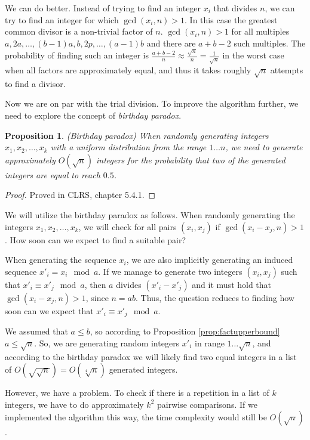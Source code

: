 \documentclass[12pt] {article}
\theoremstyle{plain}
\newtheorem{prop}[thm]{Proposition}
\theoremstyle{definition}
\begin{document}
We can do better. Instead of trying to find an integer $x_i$ that divides $n$, we can try to find an integer for which $\gcd(x_i, n) > 1$. In this case the greatest common divisor is a non-trivial factor of $n$. $\gcd(x_i, n) > 1$ for all multiples $a, 2a, \dots, (b-1)a, b, 2p, \dots, (a-1)b$ and there are $a + b - 2$ such multiples. The probability of finding such an integer is $\frac{a+b-2}{n} \approx \frac{\sqrt{n}}{n} = \frac{1}{\sqrt{n}}$ in the worst case when all factors are approximately equal, and thus it takes roughly $\sqrt{n}$ attempts to find a divisor.

Now we are on par with the trial division. To improve the algorithm further, we need to explore the concept of \textit{birthday paradox}.

\begin{prop} (Birthday paradox)
\label {prop:birthdayparadox}
When randomly generating integers $x_1, x_2, \dots, x_k$ with a uniform distribution from the range $1 \dots n$, we need to generate approximately $O(\sqrt{n})$ integers for the probability that two of the generated integers are equal to reach $0.5$.
\end{prop}

\begin{proof}
Proved in CLRS, chapter 5.4.1\cite{clrs}.
\end{proof}

We will utilize the birthday paradox as follows. When randomly generating the integers $x_1, x_2, \dots, x_k$, we will check for all pairs $(x_i, x_j)$ if $\gcd(x_i - x_j, n) > 1$. How soon can we expect to find a suitable pair?

When generating the sequence $x_i$, we are also implicitly generating an induced sequence $x'_i = x_i \mod a$. If we manage to generate two integers $(x_i, x_j)$ such that $x'_i \equiv x'_j \mod a$, then $a$ divides $(x'_i-x'_j)$ and it must hold that $\gcd(x_i-x_j, n) > 1$, since $n = ab$. Thus, the question reduces to finding how soon can we expect that $x'_i \equiv x'_j \mod a$.

We assumed that $a \leq b$, so according to Proposition \ref{prop:factupperbound} $a \leq \sqrt{n}$. So, we are generating random integers $x'_i$ in range $1 \dots \sqrt{n}$, and according to the birthday paradox we will likely find two equal integers in a list of $O(\sqrt{\sqrt{n}}) = O(\sqrt[4]{n})$ generated integers.

However, we have a problem. To check if there is a repetition in a list of $k$ integers, we have to do approximately $k^2$ pairwise comparisons. If we implemented the algorithm this way, the time complexity would still be $O(\sqrt{n})$.
\end{document}
